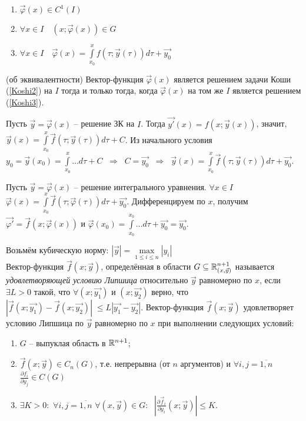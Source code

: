 \begin{enumerate}
    \item $\vec{\varphi}(x) \in C^1(I)$
    \item $\forall x \in I \quad (x; \vec{\varphi}(x)) \in G$
    \item $\forall x \in I \quad \vec{\varphi}(x) = \int \limits_{x_0}^x f(\tau; \vec{y}(\tau))d\tau + \vec{y_0}$
\end{enumerate}

\Lemma (об эквивалентности) Вектор-функция $\vec{\varphi}(x)$ является решением задачи Коши (\ref{Koshi2}) на $I$ тогда и только тогда, когда $\vec{\varphi}(x)$ на том же $I$ является решением (\ref{Koshi3}).

\Proof

\fbox{$\Longrightarrow$} Пусть $\vec{y}=\vec{\varphi}(x)$ -- решение ЗК на $I$. Тогда $\vec{y'}(x) = f(x; \vec{y}(x))$, значит, $\vec{y}(x) = \int \limits_{x_0}^{x} \vec{f}(\tau; \vec{y}(\tau))d\tau + C$. Из начального условия $y_0 = \vec{y}(x_0) = \int \limits_{x_0}^x \dots d\tau + C \;\;\Rightarrow\;\; C = \vec{y_0} \;\;\Rightarrow\;\; \vec{y}(x) = \int \limits_{x_0}^{x} \vec{f}(\tau; \vec{y}(\tau))d\tau + \vec{y_0}$.

\fbox{$\Longleftarrow$} Пусть $\vec{y}=\vec{\varphi}(x)$ -- решение интегрального уравнения. $\forall x \in I$ $\vec{\varphi}(x) = 
\int \limits_{x_0}^{x} \vec{f}(\tau; \vec{\varphi}(\tau))d\tau + \vec{y_0}$.
\newline Дифференцируем по $x$, получим 
\(\vec{\varphi'} = \vec{f}(x;\vec{\varphi}(x))\) \;и\; 
\(\vec{\varphi}(x_0) = \int \limits_{x_0}^{x_0} \dots d\tau + \vec{y_0} = \vec{y_0}\). \quad \EndProof


Возьмём кубическую норму: $|\vec{y}| = \max \limits_{1 \leqslant i \leqslant n} |y_i|$
\\
\Def Вектор-функция $\vec{f}(x; \vec{y})$, определённая в области $G \subseteq \mathbb{R}_{(x, \vec{y})}^{n + 1}$ называется \textit{удовлетворяющей условию Липшица} относительно $\vec{y}$ равномерно по $x$, если $\exists L > 0$ такой, что $\forall (x; \vec{y_1})$ и $(x; \vec{y_2})$ верно, что $|\vec{f}(x; \vec{y_1}) - \vec{f}(x; \vec{y_2})|\; \leqslant L|\vec{y_1} - \vec{y_2}|$.
\bigbreak
\Lemma Вектор-функция $\vec{f}(x; \vec{y})$ удовлетворяет условию Липшица по $\vec{y}$ равномерно по $x$ при выполнении следующих условий:

\begin{enumerate}
    \item $G$ -- выпуклая область в $\mathbb{R}^{n + 1}$;
    \item $\vec{f} (x; \vec{y}) \in C_n(G)$, т.е. непрерывна (от $n$ аргументов) и $\forall i, j = \overline{1,n}$\; $\frac{\partial f_i}{\partial y_j} \in C(G)$
    \item $\exists K > 0:$ $\forall i, j = \overline{1,n}$ \; $\forall (x, \vec{y}) \in G:\;$ $|\frac{\partial \vec{f}_i}{\partial y_i} (x; \vec{y})| \leqslant K$.
\end{enumerate}

